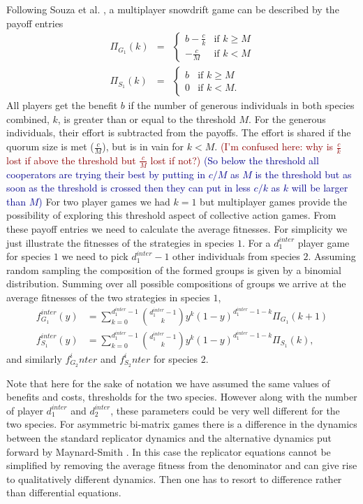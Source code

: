 \documentclass[12pt]{article}
\newcommand{\cha}[1]{\textcolor{darkblue}{(#1)}}
\newcommand{\marcus}[1]{\textcolor{darkred}{(#1)}}
\begin{document}
\begin{appendices}
Following Souza et al. \citep{souza:JTB:2009},  
a multiplayer snowdrift game can be described by the payoff entries
\begin{eqnarray}
\Pi_{G_1} (k)  &=& \begin{cases} b-\frac{c}{k} & \textrm{if } k \geq M \\  -\frac{c}{M} & \textrm{if } k < M \end{cases} 
\\
\Pi_{S_1} (k)  &=& \begin{cases} b & \textrm{if } k \geq M \\ 0 & \textrm{if } k < M. \end{cases}
\label{eqintergamepayoffs}
\end{eqnarray}
%
All players get the benefit $b$ if the number of generous individuals in both species combined, $k$, is greater than or equal to the threshold $M$.
For the generous individuals, their effort is subtracted from the payoffs.
The effort is shared if the quorum size is met ($\frac{c}{M}$), but is in vain for $k<M$. \marcus{I'm confused here: why is $\frac{c}{k}$ lost if above the threshold but  $\frac{c}{M}$ lost if not?}
\cha{So below the threshold all cooperators are trying their best by putting in $c/M$ as $M$ is the threshold but as soon as the threshold is crossed then they can put in less $c/k$ as $k$ will be larger than $M$}
For two player games we had $k=1$ but multiplayer games provide the possibility of exploring this threshold aspect of collective action games.
From these payoff entries we need to calculate the average fitnesses.
For simplicity we just illustrate the fitnesses of the strategies in species $1$.
For a $d_1^{inter}$ player game for species $1$ we need to pick $d_1^{inter}-1$ other individuals from species $2$.
Assuming random sampling the composition of the formed groups is given by a binomial distribution.
Summing over all possible compositions of groups we arrive at  the average fitnesses of the two strategies in species $1$,
%
\begin{align}
f^{inter}_{G_1} (y) &= \sum_{k=0}^{d_1^{inter} -1} \binom{d_1^{inter} -1}{k}y^k (1-y)^{d_1^{inter} -1-k} \Pi_{G_1}(k+1)  \\
f^{inter}_{S_1} (y) &= \sum_{k=0}^{d_1^{inter} -1} \binom{d_1^{inter} -1}{k}y^k (1-y)^{d_1^{inter} -1-k} \Pi_{S_1}(k),
\label{interfiteqs}
\end{align}
%
and similarly $f_{G_2}^inter$ and $f_{S_2}^inter$ for species $2$.

Note that here for the sake of notation we have assumed the same values of benefits and costs, thresholds for the two species. However along with the number of player $d_1^{inter}$ and $d_2^{inter}$, these parameters could be very well different for the two species.
For asymmetric bi-matrix games there is a difference in the dynamics between the standard replicator dynamics and the alternative dynamics put forward by Maynard-Smith \citep{maynard-smith:book:1982}.
In this case the replicator equations cannot be simplified by removing the average fitness from the denominator and can give rise to qualitatively different dynamics. 
Then one has to resort to difference rather than differential equations.


\end{appendices}
\end{document}
